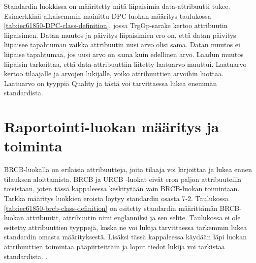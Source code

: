 Standardin luokkissa on määritetty mitä liipaisimia data-attribuutti tukee. Esimerkkinä aikaisemmin mainittu DPC-luo\-kan määritys taulukossa \ref{tab:iec61850-DPC-class-definition}, jossa TrgOp-sarake kertoo attribuutin liipaisimen. Datan muutos ja päivitys liipaisimien ero on, että datan päivitys liipaisee tapahtuman vaikka attribuutin uusi arvo olisi sama. Datan muutos ei liipaise tapahtumaa, jos uusi arvo on sama kuin edellinen arvo. Laadun muutos liipaisin tarkoittaa, että data-attribuuttiin liitetty laatuarvo muuttui. Laatuarvo kertoo tilaajalle ja arvojen lukijalle, voiko attribuuttien arvoihin luottaa. Laatuarvo on tyyppiä Quality ja tästä voi tarvittaessa lukea enemmän standardista. \mbox{\cite[s.~90]{IEC61850-7-1}}


\section{Raportointi-luokan määritys ja toiminta}
\label{ch:rcb-toiminta}


BRCB-luokalla on erilaisia attribuutteja, joita tilaaja voi kirjoittaa ja lukea ennen tilauksen aloittamista. BRCB ja URCB -luokat eivät eroa paljon attribuuteilla toisistaan, joten tässä kappaleessa keskitytään vain BRCB-luokan toimintaan. Tarkka määritys luokkien eroista löytyy standardin osasta 7-2. Taulukossa \ref{tab:iec61850-brcb-class-definition} on esitetty standardin määrittämän BRCB-luokan attribuutit, attribuutin nimi englanniksi ja sen selite. Taulukossa ei ole esitetty attribuuttien tyyppejä, koska ne voi lukija tarvittaessa tarkemmin lukea standardin omasta määrityksestä. Lisäksi tässä kappaleessa käydään läpi luokan attribuuttien toimintaa pääpiirteittäin ja loput tiedot lukija voi tarkistaa standardista. \mbox{\cite[s.~93--118]{IEC61850-7-2}}.

